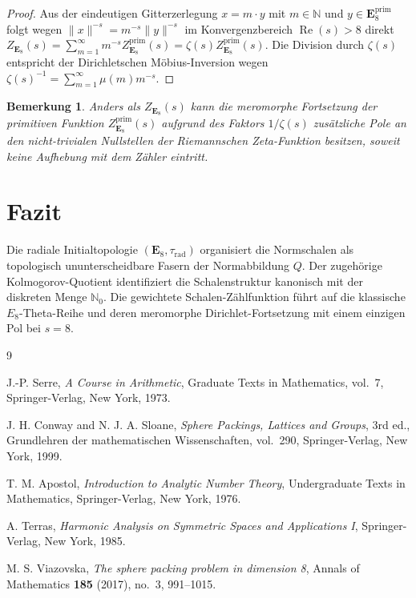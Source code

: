 \documentclass[11pt,a4paper]{article}
\newtheorem{remark}{Bemerkung}
\begin{document}
	\begin{proof}
		Aus der eindeutigen Gitterzerlegung $x = m \cdot y$ mit $m \in \mathbb{N}$ und $y \in \mathbf{E}_8^{\text{prim}}$ folgt wegen $\|x\|^{-s} = m^{-s} \|y\|^{-s}$ im Konvergenzbereich $\operatorname{Re}(s) > 8$ direkt $Z_{\mathbf{E}_8}(s) = \sum_{m=1}^\infty m^{-s} Z_{\mathbf{E}_8}^{\text{prim}}(s) = \zeta(s) Z_{\mathbf{E}_8}^{\text{prim}}(s)$. Die Division durch $\zeta(s)$ entspricht der Dirichletschen Möbius-Inversion wegen $\zeta(s)^{-1} = \sum_{m=1}^\infty \mu(m) m^{-s}$.
	\end{proof}
	
	\begin{remark}
		Anders als $Z_{\mathbf{E}_8}(s)$ kann die meromorphe Fortsetzung der primitiven Funktion $Z_{\mathbf{E}_8}^{\text{prim}}(s)$ aufgrund des Faktors $1/\zeta(s)$ zusätzliche Pole an den nicht-trivialen Nullstellen der Riemannschen Zeta-Funktion besitzen, soweit keine Aufhebung mit dem Zähler eintritt.
	\end{remark}
	
	\section{Fazit}
	Die radiale Initialtopologie $(\mathbf{E}_8, \tau_{\text{rad}})$ organisiert die Normschalen als topologisch ununterscheidbare Fasern der Normabbildung $Q$. Der zugehörige Kolmogorov-Quotient identifiziert die Schalenstruktur kanonisch mit der diskreten Menge $\mathbb{N}_0$. Die gewichtete Schalen-Zählfunktion führt auf die klassische $E_8$-Theta-Reihe und deren meromorphe Dirichlet-Fortsetzung mit einem einzigen Pol bei $s=8$.
	
	\begin{thebibliography}{9}
		
		J.-P. Serre, \emph{A Course in Arithmetic}, Graduate Texts in Mathematics, vol.~7, Springer-Verlag, New York, 1973.
		
		J. H. Conway and N. J. A. Sloane, \emph{Sphere Packings, Lattices and Groups}, 3rd ed., Grundlehren der mathematischen Wissenschaften, vol.~290, Springer-Verlag, New York, 1999.
		
		T. M. Apostol, \emph{Introduction to Analytic Number Theory}, Undergraduate Texts in Mathematics, Springer-Verlag, New York, 1976.
		
		A. Terras, \emph{Harmonic Analysis on Symmetric Spaces and Applications I}, Springer-Verlag, New York, 1985.
		
		M. S. Viazovska, \emph{The sphere packing problem in dimension 8}, Annals of Mathematics \textbf{185} (2017), no.~3, 991--1015.
		
	\end{thebibliography}
	
\end{document}
